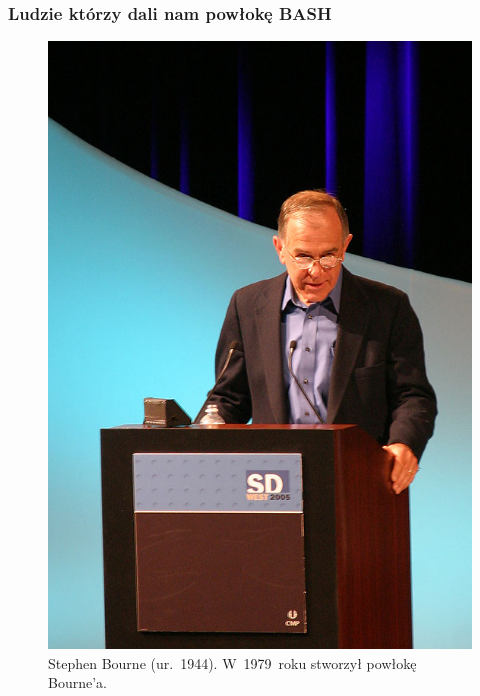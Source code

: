 \documentclass[10pt,t]{beamer}
\begin{document}
\begin{frame}
  \frametitle{Ludzie którzy dali nam powłokę BASH}


  \begin{figure}

    \centering


    \includegraphics[scale=0.55]
    {./PresentationsPictures/OS-heroes-Pictures/Steve-Bourne.jpeg}

    \caption{Stephen Bourne (ur.~1944). W~1979~roku stworzył powłokę
      Bourne’a.}

    \label{fig:Stephen-Bourne}

  \end{figure}

\end{frame}
\end{document}

